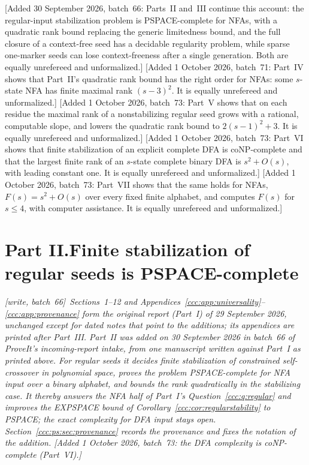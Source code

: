 \documentclass[11pt,letterpaper]{article}
\theoremstyle{definition}
\theoremstyle{remark}
\newcommand{\wsix}{\textup{[write, batch~66]}}
\newcommand{\wadd}[1]{\textup{[}Added 30 September 2026, batch~66: #1\textup{]}}
\newcommand{\waddsevone}[1]{\textup{[}Added 1 October 2026, batch~71: #1\textup{]}}
\newcommand{\waddsevthree}[1]{\textup{[}Added 1 October 2026, batch~73: #1\textup{]}}
\begin{document}
\wadd{Parts~II and~III continue this account: the regular-input
stabilization problem is PSPACE-complete for NFAs, with a quadratic rank
bound replacing the generic limitedness bound, and the full closure of a
context-free seed has a decidable regularity problem, while sparse one-marker
seeds can lose context-freeness after a single generation. Both are equally
unrefereed and unformalized.}
\waddsevone{Part~IV shows that Part~II's quadratic rank bound has the right
order for NFAs: some $s$-state NFA has finite maximal rank $(s-3)^2$. It is
equally unrefereed and unformalized.}
\waddsevthree{Part~V shows that on each residue the maximal rank of a
nonstabilizing regular seed grows with a rational, computable slope, and
lowers the quadratic rank bound to $2(s-1)^2+3$. It is equally unrefereed and
unformalized.}
\waddsevthree{Part~VI shows that finite stabilization of an explicit complete
DFA is coNP-complete and that the largest finite rank of an $s$-state
complete binary DFA is $s^2+O(s)$, with leading constant one. It is equally
unrefereed and unformalized.}
\waddsevthree{Part~VII shows that the same holds for NFAs, $F(s)=s^2+O(s)$ over
every fixed finite alphabet, and computes $F(s)$ for $s\le4$, with computer
assistance. It is equally unrefereed and unformalized.}

\clearpage
\part*{Part II.\quad Finite stabilization of regular seeds is PSPACE-complete}

\noindent\emph{\wsix\ Sections~1--12 and
Appendices~\ref{ccc:app:universality}--\ref{ccc:app:provenance} form the
original report (Part~I) of 29 September 2026, unchanged except for dated
notes that point to the additions; its appendices are printed after
Part~III. Part~II was added on 30 September 2026 in batch~66 of ProveIt's
incoming-report intake, from one manuscript written against Part~I as
printed above. For regular seeds it decides finite stabilization of
constrained self-crossover in polynomial space, proves the problem
PSPACE-complete for NFA input over a binary alphabet, and bounds the rank
quadratically in the stabilizing case. It thereby answers the NFA half of
Part~I's Question~\ref{ccc:q:regular} and improves the EXPSPACE bound of
Corollary~\ref{ccc:cor:regularstability} to PSPACE; the exact complexity for
DFA input stays open. Section~\ref{ccc:ps:sec:provenance} records the
provenance and fixes the notation of the addition.
\waddsevthree{the DFA complexity is coNP-complete (Part~VI).}}
\end{document}
